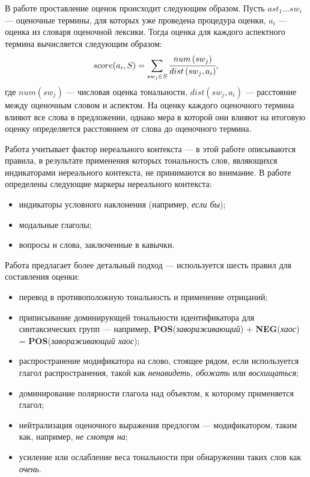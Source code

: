 В работе \cite{negation} проставление оценок происходит следующим образом. Пусть $ast_1 \dots sw_i$ --- оценочные термины, для которых уже проведена процедура оценки, $a_i$ --- оценка из словаря оценочной лексики. Тогда оценка для каждого аспектного термина вычисляется следующим образом: 
\begin{equation}
	score(a_i, S) = \sum_{sw_j \in S}\cfrac{num\left(sw_j\right)}{dist\left( sw_j, a_i\right)},
\end{equation}
где $num\left(sw_j\right)$ --- числовая оценка тональности, $dist\left( sw_j, a_i\right)$ --- расстояние между оценочным словом и аспектом. На оценку каждого оценочного термина влияют все слова в предложении, однако мера в которой они влияют на итоговую оценку определяется расстоянием от слова до оценочного термина. 

Работа \cite{modf} учитывает фактор нереального контекста --- в этой работе описываются правила, в результате применения которых тональность слов, являющихся индикаторами нереального контекста, не принимаются во внимание. В работе определены следующие маркеры нереального контекста: 
\begin{itemize}
	\item индикаторы условного наклонения (например, \textit{если бы});
	\item модальные глаголы;
	\item вопросы и слова, заключенные в кавычки.
\end{itemize}

Работа \cite{8pattrns} предлагает более детальный подход --- используется шесть правил для составления оценки:
\begin{itemize}
	\item перевод в противоположную тональность и применение отрицаний;
	\item приписывание доминирующей тональности идентификатора для синтаксических групп --- например, \textbf{POS}(\textit{завораживающий}) + \textbf{NEG}(\textit{хаос}) \\ = \textbf{POS}(\textit{завораживающий хаос});
	\item распространение модификатора на слово, стоящее рядом, если используется глагол распространения, такой как \textit{ненавидеть, обожать} или \textit{восхищаться};
	\item доминирование полярности глагола над объектом, к которому применяется глагол;
	\item нейтрализация оценочного выражения предлогом --- модификатором, таким как, например, \textit{не смотря на};
	\item усиление или ослабление веса тональности при обнаружении таких слов как \textit{очень}.
\end{itemize}

